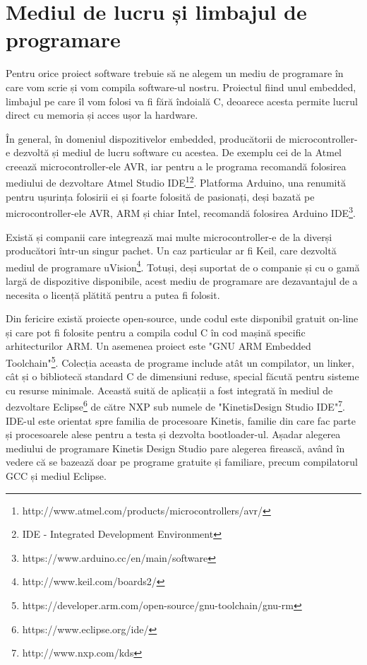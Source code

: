 \documentclass[12pt,a4paper,titlepage]{report}
\begin{document}
\section{Mediul de lucru și limbajul de programare}

Pentru orice proiect software trebuie să ne alegem un mediu de programare în care vom scrie și vom compila software-ul nostru. Proiectul fiind unul embedded, limbajul pe care îl vom folosi va fi fără îndoială C, deoarece acesta permite lucrul direct cu memoria și acces ușor la hardware.

În general, în domeniul dispozitivelor embedded, producătorii de microcontroller-e dezvoltă și mediul de lucru software cu acestea.
De exemplu cei de la Atmel creează microcontroller-ele AVR, iar pentru a le programa recomandă folosirea mediului de dezvoltare Atmel Studio IDE\footnote{http://www.atmel.com/products/microcontrollers/avr/}\footnote{IDE - Integrated Development Environment}. Platforma Arduino, una renumită pentru ușurința folosirii ei și foarte folosită de pasionați, deși bazată pe microcontroller-ele AVR, ARM și chiar Intel, recomandă folosirea Arduino IDE\footnote{https://www.arduino.cc/en/main/software}.

Există și companii care integrează mai multe microcontroller-e de la diverși producători într-un singur pachet. Un caz particular ar fi Keil, care dezvoltă mediul de programare uVision\footnote{http://www.keil.com/boards2/}. Totuși, deși suportat de o companie și cu o gamă largă de dispozitive disponibile, acest mediu de programare are dezavantajul de a necesita o licență plătită pentru a putea fi folosit.

Din fericire există proiecte open-source, unde codul este disponibil gratuit on-line și care pot fi folosite pentru a compila codul C în cod mașină specific arhitecturilor ARM. Un asemenea proiect este "GNU ARM Embedded Toolchain"\footnote{https://developer.arm.com/open-source/gnu-toolchain/gnu-rm}. Colecția aceasta de programe include atât un compilator, un linker, cât și o bibliotecă standard C de dimensiuni reduse, special făcută pentru sisteme cu resurse minimale. Această suită de aplicații a fost integrată în mediul de dezvoltare Eclipse\footnote{https://www.eclipse.org/ide/} de către NXP sub numele de "Kinetis\textregistered Design Studio IDE"\footnote{http://www.nxp.com/kds}. IDE-ul este orientat spre familia de procesoare Kinetis, familie din care fac parte și procesoarele alese pentru a testa și dezvolta bootloader-ul. Așadar alegerea mediului de programare Kinetis Design Studio pare alegerea firească, având în vedere că se bazează doar pe programe gratuite și familiare, precum compilatorul GCC și mediul Eclipse. 
\end{document}

